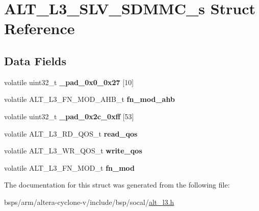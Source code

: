 \hypertarget{structALT__L3__SLV__SDMMC__s}{}\section{A\+L\+T\+\_\+\+L3\+\_\+\+S\+L\+V\+\_\+\+S\+D\+M\+M\+C\+\_\+s Struct Reference}
\label{structALT__L3__SLV__SDMMC__s}
\subsection*{Data Fields}
\begin{DoxyCompactItemize}
\item 
\mbox{\label{structALT__L3__SLV__SDMMC__s_a688fe1571d5682162255c1f2e8c08e9c}} 
volatile uint32\+\_\+t {\bfseries \+\_\+pad\+\_\+0x0\+\_\+0x27} \mbox{[}10\mbox{]}
\item 
\mbox{\label{structALT__L3__SLV__SDMMC__s_a44d4f74f2d0dd6b6875a0228d193194d}} 
volatile A\+L\+T\+\_\+\+L3\+\_\+\+F\+N\+\_\+\+M\+O\+D\+\_\+\+A\+H\+B\+\_\+t {\bfseries fn\+\_\+mod\+\_\+ahb}
\item 
\mbox{\label{structALT__L3__SLV__SDMMC__s_a5e63aa1afc9c75f80bb4e93b291889ee}} 
volatile uint32\+\_\+t {\bfseries \+\_\+pad\+\_\+0x2c\+\_\+0xff} \mbox{[}53\mbox{]}
\item 
\mbox{\label{structALT__L3__SLV__SDMMC__s_a09da0e0d41198910d42a3333b9129b44}} 
volatile A\+L\+T\+\_\+\+L3\+\_\+\+R\+D\+\_\+\+Q\+O\+S\+\_\+t {\bfseries read\+\_\+qos}
\item 
\mbox{\label{structALT__L3__SLV__SDMMC__s_a58c26ed081da3126b603cb42a7fa8731}} 
volatile A\+L\+T\+\_\+\+L3\+\_\+\+W\+R\+\_\+\+Q\+O\+S\+\_\+t {\bfseries write\+\_\+qos}
\item 
\mbox{\label{structALT__L3__SLV__SDMMC__s_a082ac5603ce26cf77473e29671433d9d}} 
volatile A\+L\+T\+\_\+\+L3\+\_\+\+F\+N\+\_\+\+M\+O\+D\+\_\+t {\bfseries fn\+\_\+mod}
\end{DoxyCompactItemize}


The documentation for this struct was generated from the following file\+:\begin{DoxyCompactItemize}
\item 
bsps/arm/altera-\/cyclone-\/v/include/bsp/socal/\mbox{\hyperlink{alt__l3_8h}{alt\+\_\+l3.\+h}}\end{DoxyCompactItemize}
